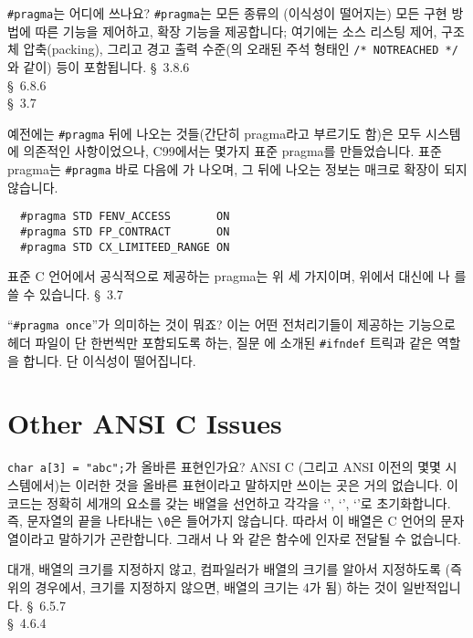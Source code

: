 \begin{faq}
	\verb+#pragma+는 어디에 쓰나요?
\A
	\verb+#pragma+는 모든 종류의 (이식성이 떨어지는) 모든 구현 방법에
	따른 기능을 제어하고, 확장 기능을 제공합니다; 여기에는
	소스 리스팅 제어, 구조체 압축(packing), 그리고 
        경고 출력 수준(의
        오래된 주석 형태인 \verb+/* NOTREACHED */+와 같이) 등이 
	포함됩니다.
\R
	\cite{ansi} \S\ 3.8.6 \\
	\cite{c89} \S\ 6.8.6 \\
        \cite{hs} \S\ 3.7 

\T
	예전에는 \verb+#pragma+ 뒤에 나오는 것들(간단히 pragma라고 부르기도
        함)은 모두 시스템에 의존적인 사항이었으나, C99에서는 몇가지 표준
        pragma를 만들었습니다. 표준 pragma는 \verb+#pragma+ 바로 다음에
        가 나오며, 그 뒤에 나오는 정보는 매크로 확장이 되지 않습니다.
\begin{verbatim}
  #pragma STD FENV_ACCESS       ON
  #pragma STD FP_CONTRACT       ON
  #pragma STD CX_LIMITEED_RANGE ON
\end{verbatim}
	표준 C 언어에서 공식적으로 제공하는 pragma는 위 세 가지이며, 위에서
         대신에 나 를 쓸 수 있습니다.
\R
	\cite{hs5} \S\ 3.7 
\end{faq}

\begin{faq}
	``\verb+#pragma once+''가 의미하는 것이 뭐죠?
\A
	이는 어떤 전처리기들이 제공하는 기능으로 헤더 파일이 단 한번씩만
	포함되도록 하는, 질문 에 소개된 \verb+#ifndef+ 트릭과 같은 역할을
	합니다.  단 이식성이 떨어집니다.
\end{faq}

\section{Other ANSI C Issues}

\begin{faq}
	\verb+char a[3] = "abc";+가 올바른 표현인가요?
\A
	ANSI C (그리고 ANSI 이전의 몇몇 시스템에서)는 이러한 것을 올바른
	표현이라고 말하지만 쓰이는 곳은 거의 없습니다.  이 코드는 정확히
	세개의 요소를 갖는 배열을 선언하고 각각을 `', `',
	`'로 초기화합니다.
	즉, 문자열의 끝을 나타내는 \verb+\0+은 들어가지 않습니다.
	따라서 이 배열은 C 언어의 문자열이라고 말하기가 곤란합니다.
	그래서 나 와 같은 함수에 인자로
	전달될 수 없습니다.

	대개, 배열의 크기를 지정하지 않고, 컴파일러가 배열의
	크기를 알아서 지정하도록 (즉 위의 경우에서, 크기를 지정하지 않으면,
	배열의 크기는 4가 됨) 하는 것이 일반적입니다.
\R
	\cite{c89} \S\ 6.5.7 \\
	\cite{hs} \S\ 4.6.4 
\end{faq}

